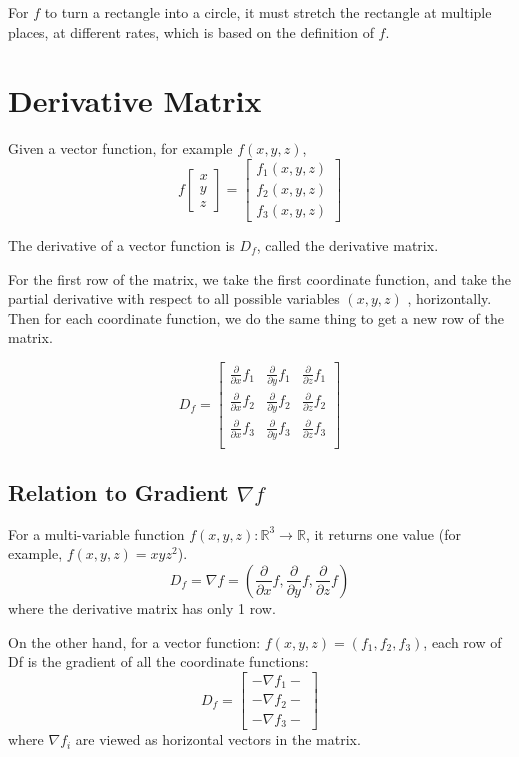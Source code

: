 For $f$ to turn a rectangle into a circle, it must stretch the rectangle at multiple places, at different rates, which is based on the definition of $f$.

\section{Derivative Matrix}

Given a vector function, for example $f(x,y,z)$, $$f\begin{bmatrix} x \\ y \\ z \end{bmatrix} = \begin{bmatrix} f_1(x,y,z) \\ f_2(x,y,z) \\ f_3(x,y,z) \end{bmatrix}$$

The derivative of a vector function is $D_f$, called the derivative matrix.

For the first row of the matrix, we take the first coordinate function, and take the partial derivative with respect to all possible variables $(x,y,z)$ , horizontally. Then for each coordinate function, we do the same thing to get a new row of the matrix. 

$$D_f = \begin{bmatrix}
    \frac{\partial}{\partial x} f_1 & \frac{\partial}{\partial y} f_1 & \frac{\partial}{\partial z} f_1 \\
    \frac{\partial}{\partial x} f_2 & \frac{\partial}{\partial y} f_2 & \frac{\partial}{\partial z} f_2 \\
    \frac{\partial}{\partial x} f_3 & \frac{\partial}{\partial y} f_3 & \frac{\partial}{\partial z} f_3 \\
\end{bmatrix}$$

\subsection*{Relation to Gradient $\nabla f$}

For a multi-variable function $f(x, y, z): \mathbb{R}^3 \to \mathbb{R}$, it returns one value (for example, $f(x,y,z) = xyz^2$). $$D_f = \nabla f = (\frac{\partial}{\partial x} f, \frac{\partial}{\partial y} f, \frac{\partial}{\partial z} f)$$ where the derivative matrix has only 1 row. 

On the other hand, for a vector function: $f(x, y, z) = (f_1, f_2, f_3)$, each row
of Df is the gradient of all the coordinate functions: $$D_f = \begin{bmatrix} - \nabla f_1 - \\ - \nabla f_2 - \\ - \nabla f_3 - \end{bmatrix}$$ where $\nabla f_i$ are viewed as horizontal vectors in the matrix.

